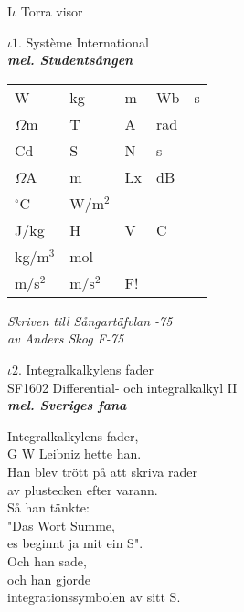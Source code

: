 \documentclass[a6paper,10pt]{article}
\newcommand{\mel}[1]{\small\textbf{\textit{mel. #1 \\}}}
\begin{document}
\noindent
\huge{I$\iota$ Torra visor}
\begin{center}
\Large $\iota1$. Système International \\ 
\mel{Studentsången}
\end{center}
\vspace{-10pt}
\begin{table}[!h]
\begin{tabularx}{0.85\textwidth}{X X X X X}
W&kg&m&Wb&s
\vspace{3pt} \\
$\Omega$m&T&A&rad
\vspace{3pt} \\
Cd&S&N&s
\vspace{3pt} \\
$\Omega$A&m&Lx&dB
\vspace{3pt} \\
$^{\circ}$C&W/m$^2$ &
\vspace{5pt} \\
J/kg&H&V&C
\vspace{3pt} \\
kg/m$^3$ & mol
\vspace{3pt} \\
m/s$^2$&m/s$^2$&F!
\end{tabularx}
\begin{flushright}
\textit{Skriven till Sångartäfvlan -75\\ av Anders Skog F-75}
\end{flushright}
\end{table}
\begin{center}
\Large $\iota2$. Integralkalkylens fader \\ 
\footnotesize SF1602 Differential- och integralkalkyl II\\
\mel{Sveriges fana}
\end{center}
\small Integralkalkylens fader, \\
G W Leibniz hette han. \\
Han blev trött på att skriva rader \\
av plustecken efter varann. 
\vspace{5pt}\\
Så han tänkte: \\
"Das Wort Summe, \\
es beginnt ja mit ein S". \\
Och han sade, \\
och han gjorde \\
integrationssymbolen av sitt S. 
\newpage
\setlength{\oddsidemargin}{-0.47in}
\end{document}
